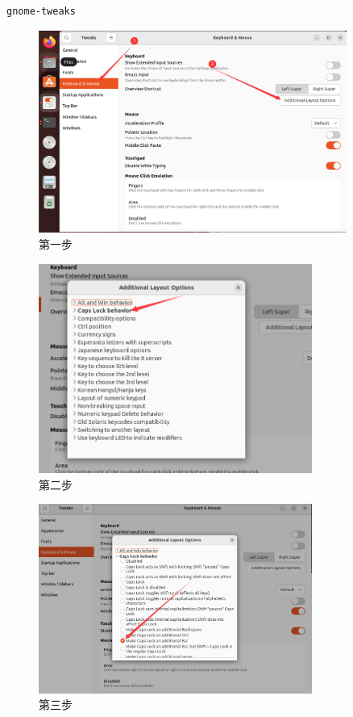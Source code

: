 \documentclass[12pt]{article}
\begin{document}
\begin{enumerate}
\begin{verbatim}
gnome-tweaks
\end{verbatim}

\begin{figure}[hbt!]
    \centering
    \includegraphics[width=0.9\textwidth]{img/one.png}
    \caption{第一步}
\end{figure}

\begin{figure}[hbt!]
    \centering
    \includegraphics[width=0.8\textwidth]{img/two.png}
    \caption{第二步}
\end{figure}

\begin{figure}[hbt!]
    \centering
    \includegraphics[width=0.8\textwidth]{img/three.png}
    \caption{第三步}
\end{figure}
\newpage


\end{enumerate}
\end{document}
